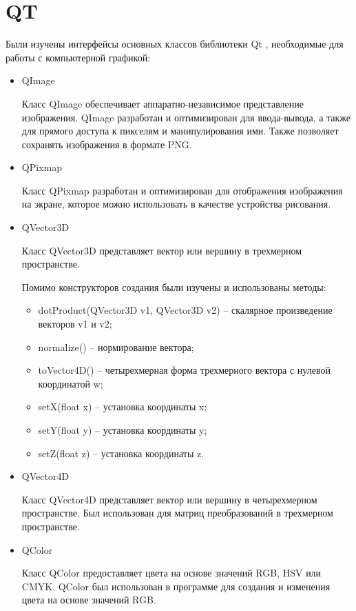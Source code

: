 \section{QT}
Были изучены интерфейсы основных классов библиотеки Qt \cite{bib4}, необходимые для работы с компьютерной графикой:
\begin{itemize}
	\item QImage
	
	Класс QImage обеспечивает аппаратно-независимое представление изображения. QImage разработан и оптимизирован для ввода-вывода, а также для прямого доступа к пикселям и манипулирования ими. Также позволяет сохранять изображения в формате PNG.
	
	\item QPixmap
	
	Класс QPixmap разработан и оптимизирован для отображения изображения на экране, которое можно использовать в качестве устройства рисования. 
	
	\item QVector3D	
	
	Класс QVector3D представляет вектор или вершину в трехмерном пространстве.
	 
	Помимо конструкторов создания были изучены и использованы методы:
	\begin{itemize}
		\item dotProduct(QVector3D v1, QVector3D v2) -- скалярное произведение векторов v1 и v2;
		\item normalize() -- нормирование вектора;
		\item toVector4D() -- четырехмерная форма трехмерного вектора с нулевой координатой w;
		\item setX(float x) -- установка координаты x;
		\item setY(float y) -- установка координаты y;
	 	\item setZ(float z) -- установка координаты z.
	\end{itemize}
	
	\item QVector4D
	
	Класс QVector4D представляет вектор или вершину в четырехмерном пространстве. Был использован для матриц преобразований в трехмерном пространстве.
	
	\item QColor
	
	Класс QColor предоставляет цвета на основе значений RGB, HSV или CMYK. QColor был использован в программе для создания и изменения цвета на основе значений RGB. 
\end{itemize}
